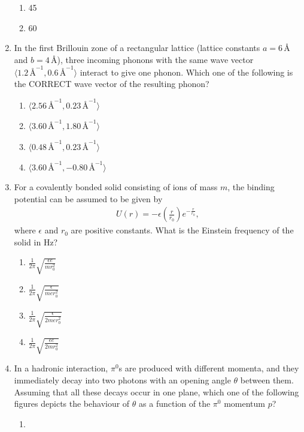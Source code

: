 \documentclass[journal]{IEEEtran}
\begin{document}
\begin{enumerate}
\begin{enumerate}
\item 45
\item 60
\end{enumerate}
\item In the first Brillouin zone of a rectangular lattice (lattice constants $a = 6 \, \text{Å}$ and $b = 4 \, \text{Å}$), three incoming phonons with the same wave vector $\langle 1.2 \, \text{Å}^{-1}, 0.6 \, \text{Å}^{-1} \rangle$ interact to give one phonon. Which one of the following is the CORRECT wave vector of the resulting phonon?
\begin{enumerate}
\item $\langle 2.56 \, \text{Å}^{-1}, 0.23 \, \text{Å}^{-1} \rangle$
\item $\langle 3.60 \, \text{Å}^{-1}, 1.80 \, \text{Å}^{-1} \rangle $
\item $\langle 0.48 \, \text{Å}^{-1}, 0.23 \, \text{Å}^{-1} \rangle$
\item $\langle 3.60 \, \text{Å}^{-1}, -0.80 \, \text{Å}^{-1} \rangle$
\end{enumerate}
\item For a covalently bonded solid consisting of ions of mass $m$, the binding potential can be assumed to be given by 
\begin{align*}
	U(r) = -\epsilon \left ( \frac{r}{r_0} \right)e^{-\frac{r}{r_0}},
\end{align*}
where $\epsilon$ and $r_0$ are positive constants. What is the Einstein frequency of the solid in Hz?
\begin{enumerate}
\item $\frac{1}{2\pi} \sqrt{\frac{\epsilon e}{m r_0^2}}$
\item $\frac{1}{2\pi} \sqrt{\frac{\epsilon }{me r_0^2}}$
\item $\frac{1}{2\pi} \sqrt{\frac{\epsilon }{2me r_0^2}}$
\item $\frac{1}{2\pi} \sqrt{\frac{\epsilon e}{2m r_0^2}}$
\end{enumerate}
\item In a hadronic interaction, $\pi^0$s are produced with different momenta, and they immediately decay into two photons with an opening angle $\theta$ between them. Assuming that all these decays occur in one plane, which one of the following figures depicts the behaviour of $\theta$ as a function of the $\pi^0$ momentum $p$?
\begin{enumerate}
\item 
\begin{figure}[H]
	\centering
	
\end{figure} 

\end{enumerate}
\end{enumerate}
\end{document}
